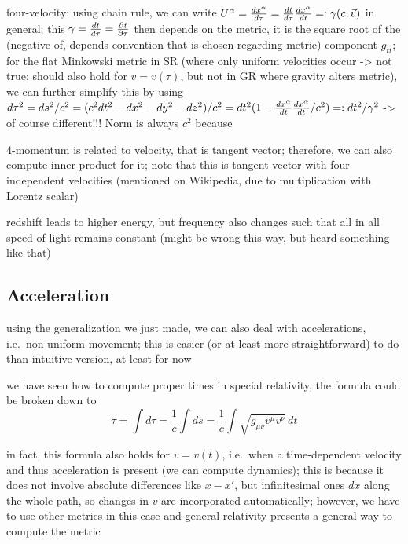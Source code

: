 four-velocity: using chain rule, we can write $U^\alpha = \dv{x^\alpha}{\tau} = \dv{t}{\tau} \dv{x^\alpha}{t} =: \gamma (c, \vec{v})$ in general; this $\gamma = \dv{t}{\tau} = \pdv{t}{\tau}$ then depends on the metric, it is the square root of the (negative of, depends convention that is chosen regarding metric) component $g_{tt}$; for the flat Minkowski metric in SR (where only uniform velocities occur -> not true; should also hold for $v = v(\tau)$, but not in GR where gravity alters metric), we can further simplify this by using $d\tau^2 = ds^2 / c^2 = (c^2 dt^2 - dx^2 - dy^2 - dz^2) / c^2 = dt^2 (1 - \dv{x^\alpha}{t} \dv{x^\alpha}{t} / c^2) =: dt^2 / \gamma^2$ -> of course different!!! Norm is always $c^2$ because 



$4$-momentum is related to velocity, that is tangent vector; therefore, we can also compute inner product for it; note that this is tangent vector with four independent velocities (mentioned on Wikipedia, due to multiplication with Lorentz scalar)



redshift leads to higher energy, but frequency also changes such that all in all speed of light remains constant (might be wrong this way, but heard something like that)




		\subsection{Acceleration}%
using the generalization we just made, we can also deal with accelerations, i.e.~non-uniform movement; this is easier (or at least more straightforward) to do than intuitive version, at least for now



we have seen how to compute proper times in special relativity, the formula could be broken down to 
\begin{equation}
\tau = \int d\tau = \frac{1}{c} \int ds = \frac{1}{c} \int \sqrt{g_{\mu \nu} v^\mu v^\nu} \, dt
\end{equation}

in fact, this formula also holds for $v = v(t)$, i.e.~when a time-dependent velocity and thus acceleration is present (we can compute dynamics); this is because it does not involve absolute differences like $x - x'$, but infinitesimal ones $dx$ along the whole path, so changes in $v$ are incorporated automatically; however, we have to use other metrics in this case and general relativity presents a general way to compute the metric



